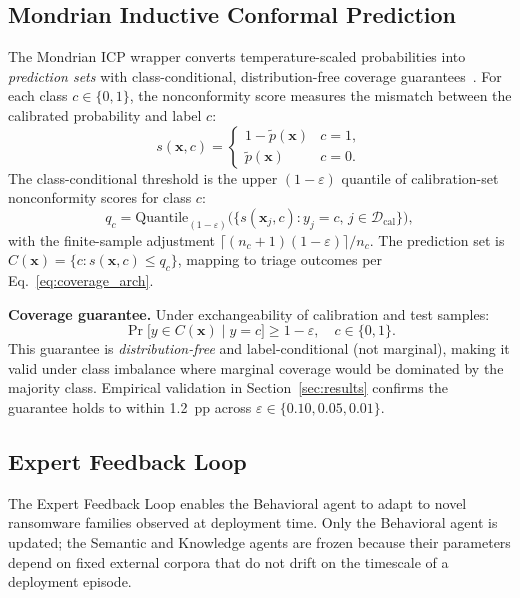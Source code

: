 \documentclass[journal]{IEEEtran}
\begin{document}
\subsection{Mondrian Inductive Conformal Prediction}
\label{subsec:mondrian}

The Mondrian ICP wrapper converts temperature-scaled probabilities into
\emph{prediction sets} with class-conditional, distribution-free coverage
guarantees~\cite{vovk_mondrian_2003,vovk_conformal_2005}.
For each class $c \in \{0,1\}$, the nonconformity score measures the mismatch
between the calibrated probability and label $c$:
\begin{equation}
s(\mathbf{x}, c) = \begin{cases}
  1 - \tilde{p}(\mathbf{x}) & c = 1, \\
  \tilde{p}(\mathbf{x})     & c = 0.
\end{cases}
\label{eq:nonconformity}
\end{equation}
The class-conditional threshold is the upper $(1-\varepsilon)$ quantile of calibration-set
nonconformity scores for class $c$:
\begin{equation}
q_c = \mathrm{Quantile}_{(1-\varepsilon)}\!\bigl(
    \{s(\mathbf{x}_j, c) : y_j = c,\, j \in \mathcal{D}_{\mathrm{cal}}\}\bigr),
\label{eq:mondrian_quantile}
\end{equation}
with the finite-sample adjustment $\lceil(n_c+1)(1-\varepsilon)\rceil/n_c$.
The prediction set is $C(\mathbf{x}) = \{c : s(\mathbf{x},c) \leq q_c\}$,
mapping to triage outcomes per Eq.~\eqref{eq:coverage_arch}.

\textbf{Coverage guarantee.}
Under exchangeability of calibration and test samples:
\begin{equation}
\Pr\!\bigl[y \in C(\mathbf{x}) \mid y = c\bigr] \geq 1-\varepsilon,\quad c \in \{0,1\}.
\label{eq:coverage_formal}
\end{equation}
This guarantee is \emph{distribution-free} and label-conditional (not marginal), making it
valid under class imbalance where marginal coverage would be dominated by the majority class.
Empirical validation in Section~\ref{sec:results} confirms the guarantee holds to within
1.2~pp across $\varepsilon \in \{0.10, 0.05, 0.01\}$.

\subsection{Expert Feedback Loop}
\label{subsec:efl}

The Expert Feedback Loop enables the Behavioral agent to adapt to novel ransomware families
observed at deployment time.
Only the Behavioral agent is updated; the Semantic and Knowledge agents are frozen
because their parameters depend on fixed external corpora that do not drift on the
timescale of a deployment episode.
\end{document}
